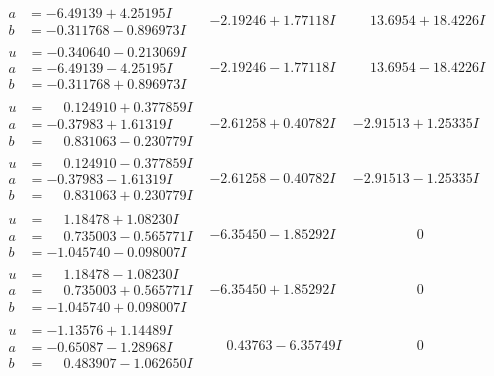 \documentclass[1p]{elsarticle_modified}
\theoremstyle{definition}
\begin{document}
$$\begin{array}{c|c|c}
\begin{aligned}
a &= -6.49139 + 4.25195 I \\
b &= -0.311768 - 0.896973 I\end{aligned}
 & -2.19246 + 1.77118 I & \phantom{-}13.6954 + 18.4226 I \\ \hline\begin{aligned}
u &= -0.340640 - 0.213069 I \\
a &= -6.49139 - 4.25195 I \\
b &= -0.311768 + 0.896973 I\end{aligned}
 & -2.19246 - 1.77118 I & \phantom{-}13.6954 - 18.4226 I \\ \hline\begin{aligned}
u &= \phantom{-}0.124910 + 0.377859 I \\
a &= -0.37983 + 1.61319 I \\
b &= \phantom{-}0.831063 - 0.230779 I\end{aligned}
 & -2.61258 + 0.40782 I & -2.91513 + 1.25335 I \\ \hline\begin{aligned}
u &= \phantom{-}0.124910 - 0.377859 I \\
a &= -0.37983 - 1.61319 I \\
b &= \phantom{-}0.831063 + 0.230779 I\end{aligned}
 & -2.61258 - 0.40782 I & -2.91513 - 1.25335 I \\ \hline\begin{aligned}
u &= \phantom{-}1.18478 + 1.08230 I \\
a &= \phantom{-}0.735003 - 0.565771 I \\
b &= -1.045740 - 0.098007 I\end{aligned}
 & -6.35450 - 1.85292 I & \phantom{-0.000000 } 0 \\ \hline\begin{aligned}
u &= \phantom{-}1.18478 - 1.08230 I \\
a &= \phantom{-}0.735003 + 0.565771 I \\
b &= -1.045740 + 0.098007 I\end{aligned}
 & -6.35450 + 1.85292 I & \phantom{-0.000000 } 0 \\ \hline\begin{aligned}
u &= -1.13576 + 1.14489 I \\
a &= -0.65087 - 1.28968 I \\
b &= \phantom{-}0.483907 - 1.062650 I\end{aligned}
 & \phantom{-}0.43763 - 6.35749 I & \phantom{-0.000000 } 0 \\ \hline\begin{aligned}

\end{aligned}
\end{array}$$
\end{document}
